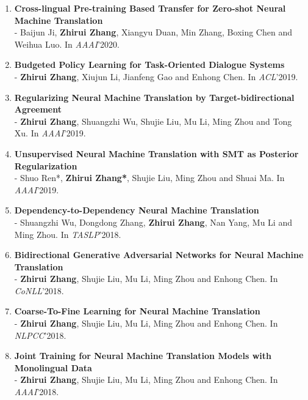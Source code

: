 \documentclass{resume}
\begin{document}
\begin{enumerate}
\item \normalsize \textbf{Cross-lingual Pre-training Based Transfer for Zero-shot Neural Machine Translation} \\
\small - Baijun Ji, \textbf{Zhirui Zhang}, Xiangyu Duan, Min Zhang, Boxing Chen and Weihua Luo. In \textit{AAAI}'2020.

\item \normalsize \textbf{Budgeted Policy Learning for Task-Oriented Dialogue Systems} \\
\small - \textbf{Zhirui Zhang}, Xiujun Li, Jianfeng Gao and Enhong Chen. In \textit{ACL}'2019.


\item \normalsize \textbf{Regularizing Neural Machine Translation by Target-bidirectional Agreement} \\
\small - \textbf{Zhirui Zhang}, Shuangzhi Wu, Shujie Liu, Mu Li, Ming Zhou and Tong Xu. In \textit{AAAI}'2019.

\item \normalsize \textbf{Unsupervised Neural Machine Translation with SMT as Posterior Regularization} \\
\small - Shuo Ren*, \textbf{Zhirui Zhang*}, Shujie Liu, Ming Zhou and Shuai Ma. In \textit{AAAI}'2019.

\item \normalsize \textbf{Dependency-to-Dependency Neural Machine Translation} \\
\small - Shuangzhi Wu, Dongdong Zhang, \textbf{Zhirui Zhang}, Nan Yang, Mu Li and Ming Zhou. In \textit{TASLP}'2018.

\item \normalsize \textbf{Bidirectional Generative Adversarial Networks for Neural Machine Translation} \\
\small - \textbf{Zhirui Zhang}, Shujie Liu, Mu Li, Ming Zhou and Enhong Chen. In \textit{CoNLL}'2018.

\item \normalsize \textbf{Coarse-To-Fine Learning for Neural Machine Translation} \\
\small - \textbf{Zhirui Zhang}, Shujie Liu, Mu Li, Ming Zhou and Enhong Chen. In \textit{NLPCC}'2018.

\item \normalsize \textbf{Joint Training for Neural Machine Translation Models with Monolingual Data} \\
\small - \textbf{Zhirui Zhang}, Shujie Liu, Mu Li, Ming Zhou and Enhong Chen. In \textit{AAAI}'2018.


\end{enumerate}
\end{document}
